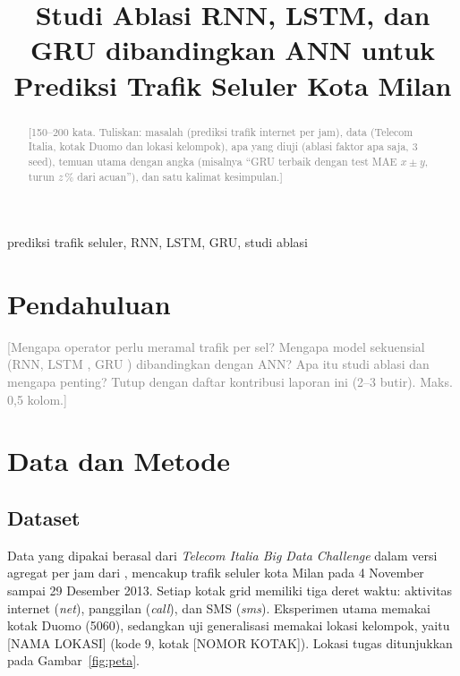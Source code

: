 \documentclass[conference,a4paper]{IEEEtran}
\newcommand{\petunjuk}[1]{\textcolor{gray}{[#1]}}
\begin{document}
\title{Studi Ablasi RNN, LSTM, dan GRU dibandingkan ANN untuk Prediksi Trafik Seluler Kota Milan}

\author{
}
\maketitle

\begin{abstract}
\petunjuk{150--200 kata. Tuliskan: masalah (prediksi trafik internet per jam), data (Telecom Italia, kotak Duomo dan lokasi kelompok), apa yang diuji (ablasi faktor apa saja, 3 seed), temuan utama dengan angka (misalnya ``GRU terbaik dengan test MAE $x \pm y$, turun $z$\,\% dari acuan''), dan satu kalimat kesimpulan.}
\end{abstract}

\begin{IEEEkeywords}
prediksi trafik seluler, RNN, LSTM, GRU, studi ablasi
\end{IEEEkeywords}

\section{Pendahuluan}
\petunjuk{Mengapa operator perlu meramal trafik per sel? Mengapa model sekuensial (RNN, LSTM \cite{hochreiter1997lstm}, GRU \cite{cho2014gru}) dibandingkan dengan ANN? Apa itu studi ablasi dan mengapa penting? Tutup dengan daftar kontribusi laporan ini (2--3 butir). Maks. 0,5 kolom.}

\section{Data dan Metode}

\subsection{Dataset}
Data yang dipakai berasal dari \textit{Telecom Italia Big Data Challenge}
\cite{barlacchi2015milan} dalam versi agregat per jam dari
\cite{zhang2021fedda}, mencakup trafik seluler kota Milan pada 4 November
sampai 29 Desember 2013. Setiap kotak grid memiliki tiga deret waktu:
aktivitas internet (\textit{net}), panggilan (\textit{call}), dan SMS
(\textit{sms}). Eksperimen utama memakai kotak Duomo (5060), sedangkan uji
generalisasi memakai lokasi kelompok, yaitu [NAMA LOKASI] (kode 9, kotak
[NOMOR KOTAK]). Lokasi tugas ditunjukkan pada Gambar~\ref{fig:peta}.
\end{document}
